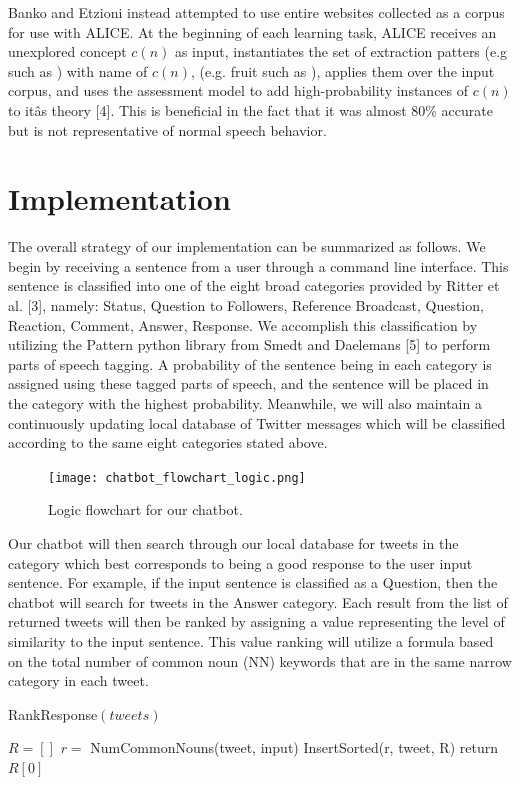 \documentclass[letterpaper]{article} %
\begin{document}
Banko and Etzioni instead attempted to use entire websites collected as a corpus for use with ALICE. At the beginning of each learning task, ALICE receives an unexplored concept $c(n)$ as input, instantiates the set of extraction patters (e.g such as ) with name of $c(n)$, (e.g. fruit such as ), applies them over the input corpus, and uses the assessment model to add high-probability instances of $c(n)$ to itâs theory [4]. This is beneficial in the fact that it was almost 80\% accurate but is not representative of normal speech behavior.

\section{Implementation}
The overall strategy of our implementation can be summarized as follows. We begin by receiving a sentence from a user through a command line interface. This sentence is classified into one of the eight broad categories provided by Ritter et al. [3], namely: Status, Question to Followers, Reference Broadcast, Question, Reaction, Comment, Answer, Response. We accomplish this classification by utilizing the Pattern python library from Smedt and Daelemans [5] to perform parts of speech tagging. A probability of the sentence being in each category is assigned using these tagged parts of speech, and the sentence will be placed in the category with the highest probability. Meanwhile, we will also maintain a continuously updating local database of Twitter messages which will be classified according to the same eight categories stated above.

\begin{figure}[h]
\centering
\texttt{[image: chatbot\_flowchart\_logic.png]}
\caption{\label{fig:chatbot_flowchart}Logic flowchart for our chatbot.}
\end{figure}

Our chatbot will then search through our local database for tweets in the category which best corresponds to being a good response to the user input sentence. For example, if the input sentence is classified as a Question, then the chatbot will search for tweets in the Answer category. Each result from the list of returned tweets will then be ranked by assigning a value representing the level of similarity to the input sentence. This value ranking will utilize a formula based on the total number of common noun (NN) keywords that are in the same narrow category in each tweet.

\begin{algorithm}[H]
RankResponse$(tweets)$
    \begin{algorithmic}[1]
    \State $R = []$
        \State $r = $ NumCommonNouns(tweet, input)
        \State InsertSorted(r, tweet, R)
    \EndFor
    \State return $R[0]$
    \end{algorithmic}
\end{algorithm}
\end{document}
